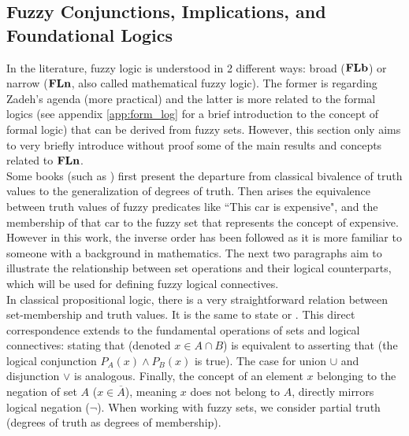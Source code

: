
\subsection{Fuzzy Conjunctions, Implications, and Foundational Logics}

In the literature\cite{HistoryFL2017}, fuzzy logic is understood in 2 different ways: broad ($\mathbf{FLb}$) or narrow ($\mathbf{FLn}$, also called mathematical fuzzy logic). The former is regarding Zadeh's agenda (more practical) and the latter is more related to the formal logics (see appendix \ref{app:form_log} for a brief introduction to the concept of formal logic) that can be derived from fuzzy sets. However, this section only aims to very briefly introduce without proof some of the main results and concepts related to $\mathbf{FLn}$.\\

Some books (such as \cite{HistoryFL2017}) first present the departure from classical bivalence of truth values to the generalization of degrees of truth. Then arises the equivalence between truth values of fuzzy predicates like ``This car is expensive", and the membership of that car to the fuzzy set that represents the concept of expensive. However in this work, the inverse order has been followed as it is more familiar to someone with a background in mathematics. The next two paragraphs aim to illustrate the relationship between set operations and their logical counterparts, which will be used for defining fuzzy logical connectives.\\


In classical propositional logic, there is a very straightforward relation between set-membership and truth values. It is the same to state  or . This direct correspondence extends to the fundamental operations of sets and logical connectives: stating that  (denoted $x \in A \cap B$) is equivalent to asserting that  (the logical conjunction $P_A(x) \land P_B(x)$ is true). The case for union $\cup$ and disjunction $\lor$ is analogous. Finally, the concept of an element $x$ belonging to the negation of set $A$ ($x \in \overline{A}$), meaning $x$ does not belong to $A$, directly mirrors logical negation ($\neg$). When working with fuzzy sets, we consider partial truth (degrees of truth as degrees of membership).\\

